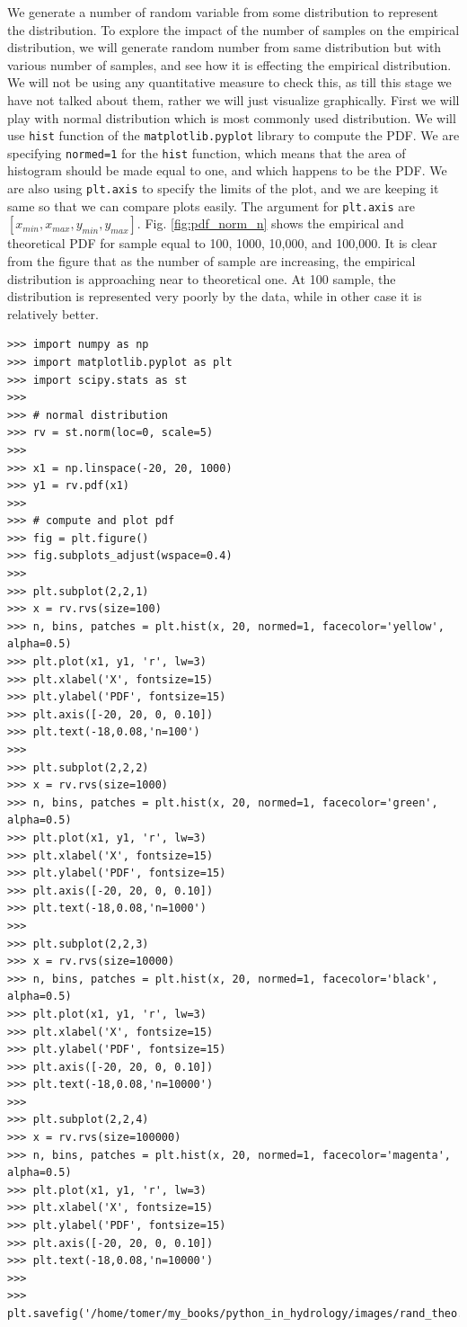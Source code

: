 \documentclass[10pt]{book}
\begin{document}
{We generate a number of random variable from some distribution to represent the distribution. To explore the impact of the number of samples on the empirical distribution, we will generate random number from same distribution but with various number of samples, and see how it is effecting the empirical distribution. We will not be using any quantitative measure to check this, as till this stage we have not talked about them, rather we will just visualize graphically. First we will play with normal distribution which is most commonly used distribution. We will use \verb"hist" function of the \verb"matplotlib.pyplot" library to compute the PDF. We are specifying \verb"normed=1" for the \verb"hist" function, which means that the area of histogram should be made equal to one, and which happens to be the PDF. We are also using \verb"plt.axis" to specify the limits of the plot, and we are keeping it same so that we can compare plots easily. The argument for \verb"plt.axis" are $[x_{min}, x_{max}, y_{min}, y_{max}]$.  Fig. \ref{fig:pdf_norm_n} shows the empirical and theoretical PDF for sample equal to 100, 1000, 10,000, and 100,000. It is clear from the figure that as the number of sample are increasing, the empirical distribution is approaching near to theoretical one. At 100 sample, the distribution is represented very poorly by the data, while in other case it is relatively better.  
\beforeverb \begin{verbatim}
>>> import numpy as np
>>> import matplotlib.pyplot as plt
>>> import scipy.stats as st
>>> 
>>> # normal distribution 
>>> rv = st.norm(loc=0, scale=5)
>>> 
>>> x1 = np.linspace(-20, 20, 1000)
>>> y1 = rv.pdf(x1)
>>> 
>>> # compute and plot pdf
>>> fig = plt.figure()
>>> fig.subplots_adjust(wspace=0.4)
>>> 
>>> plt.subplot(2,2,1)
>>> x = rv.rvs(size=100)
>>> n, bins, patches = plt.hist(x, 20, normed=1, facecolor='yellow', alpha=0.5)
>>> plt.plot(x1, y1, 'r', lw=3)
>>> plt.xlabel('X', fontsize=15)
>>> plt.ylabel('PDF', fontsize=15)
>>> plt.axis([-20, 20, 0, 0.10])
>>> plt.text(-18,0.08,'n=100')
>>> 
>>> plt.subplot(2,2,2)
>>> x = rv.rvs(size=1000)
>>> n, bins, patches = plt.hist(x, 20, normed=1, facecolor='green', alpha=0.5)
>>> plt.plot(x1, y1, 'r', lw=3)
>>> plt.xlabel('X', fontsize=15)
>>> plt.ylabel('PDF', fontsize=15)
>>> plt.axis([-20, 20, 0, 0.10])
>>> plt.text(-18,0.08,'n=1000')
>>> 
>>> plt.subplot(2,2,3)
>>> x = rv.rvs(size=10000)
>>> n, bins, patches = plt.hist(x, 20, normed=1, facecolor='black', alpha=0.5)
>>> plt.plot(x1, y1, 'r', lw=3)
>>> plt.xlabel('X', fontsize=15)
>>> plt.ylabel('PDF', fontsize=15)
>>> plt.axis([-20, 20, 0, 0.10])
>>> plt.text(-18,0.08,'n=10000')
>>> 
>>> plt.subplot(2,2,4)
>>> x = rv.rvs(size=100000)
>>> n, bins, patches = plt.hist(x, 20, normed=1, facecolor='magenta', alpha=0.5)
>>> plt.plot(x1, y1, 'r', lw=3)
>>> plt.xlabel('X', fontsize=15)
>>> plt.ylabel('PDF', fontsize=15)
>>> plt.axis([-20, 20, 0, 0.10])
>>> plt.text(-18,0.08,'n=10000')
>>> 
>>> plt.savefig('/home/tomer/my_books/python_in_hydrology/images/rand_theo.png')
\end{verbatim} \afterverb

}
\end{document}
